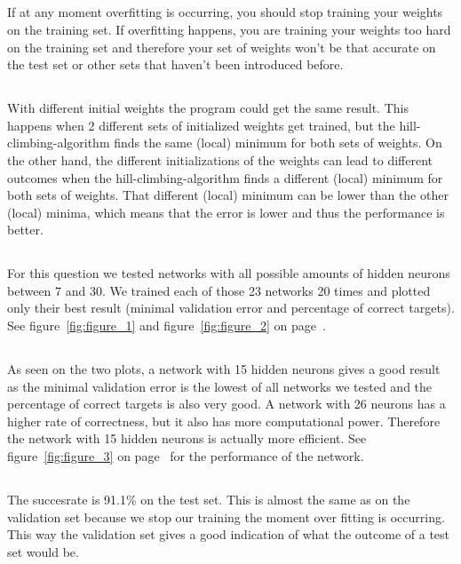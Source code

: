 \documentclass{scrartcl}
\begin{document}
  \subsection{}
 If at any moment overfitting is occurring, you should stop training your weights on the training set. If overfitting happens, you are training your weights too hard on the training set and therefore your set of weights won't be that accurate on the test set or other sets that haven't been introduced before.
  
  \subsection{}
  With different initial weights the program could get the same result. This happens when 2 different sets of initialized weights get trained, but the hill-climbing-algorithm finds the same (local) minimum for both sets of weights. On the other hand, the different initializations of the weights
 can lead to different outcomes when the hill-climbing-algorithm finds a different (local) minimum for both sets of weights. That different (local) minimum can be lower than the other (local) minima, which means that the error is lower and thus the performance is better.
 
 \subsection{}
 For this question we tested networks with all possible amounts of hidden neurons between 7 and 30. We trained each of those 23 networks 20 times and plotted only their best result (minimal validation error and percentage of correct targets).
 See figure~\ref{fig:figure_1} and figure~\ref{fig:figure_2} on page~\pageref{fig:figure_2}.

\subsection{}
As seen on the two plots, a network with 15 hidden neurons gives a good result as the minimal validation error is the lowest of all networks we tested and the percentage of correct targets is also very good. A network with 26 neurons has a higher rate of correctness, but it also has more computational power. Therefore the network with 15 hidden neurons is actually more efficient.
See figure~\ref{fig:figure_3} on page~\pageref{fig:figure_3} for the performance of the network.


\subsection{}
The succesrate is  91.1\% on the test set. This is almost the same as on the validation set because we stop our training the moment over fitting is occurring. This way the validation set gives a good indication of what the outcome of a test set would be.
\end{document}
